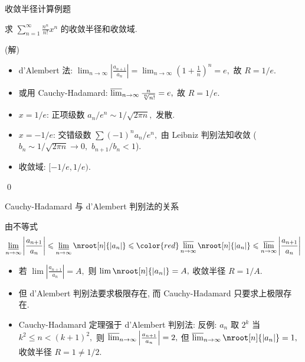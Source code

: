 \begin{frame}{收敛半径计算例题}

\begin{eg}
求 $\sum_{n=1}^\infty \frac{n^n}{n!} x^n$ 的收敛半径和收敛域.
\end{eg}

\pause

\startproof[bg=yellow, fg=red](解)
\begin{itemize}[<+->]
\item d'Alembert 法: $\lim_{n\to\infty} \left\lvert \frac{a_{n+1}}{a_n} \right\rvert = \lim_{n\to\infty} \left(1 + \frac{1}{n}\right)^n = e,$ 故 $R = 1/e.$
\item 或用 Cauchy-Hadamard: $\varlimsup_{n\to\infty} \frac{n}{\sqrt[n]{n!}} = e,$ 故 $R = 1/e.$
\item $x = 1/e$: 正项级数 $a_n/e^n \sim 1/\sqrt{2\pi n},$ 发散.
\item $x = -1/e$: 交错级数 $\sum (-1)^n a_n/e^n,$ 由 Leibniz 判别法知收敛 ($b_n \sim 1/\sqrt{2\pi n} \to 0,$ $b_{n+1}/b_n < 1$).
\item 收敛域: $[-1/e, 1/e).$
\end{itemize}
\qed

\end{frame}


\begin{frame}{Cauchy-Hadamard 与 d'Alembert 判别法的关系}

由不等式
\[\varliminf_{n\to\infty} \left\lvert \frac{a_{n+1}}{a_n} \right\rvert \leqslant \varliminf_{n\to\infty} \nroot[n]{|a_n|} \leqslant {\color{red}\varlimsup_{n\to\infty} \nroot[n]{|a_n|}} \leqslant \varlimsup_{n\to\infty} \left\lvert \frac{a_{n+1}}{a_n} \right\rvert\]

\pause

\begin{itemize}[<+->]
\item 若 $\lim \left\lvert \frac{a_{n+1}}{a_n} \right\rvert = A,$ 则 $\lim \nroot[n]{|a_n|} = A,$ 收敛半径 $R = 1/A.$
\item 但 d'Alembert 判别法要求极限存在, 而 Cauchy-Hadamard 只要求上极限存在.
\item Cauchy-Hadamard 定理{\color{red}强于} d'Alembert 判别法: 反例: $a_n$ 取 $2^k$ 当 $k^2 \leqslant n < (k+1)^2,$ 则 $\varlimsup_{n\to\infty} \left\lvert \frac{a_{n+1}}{a_n} \right\rvert = 2,$ 但 $\varlimsup_{n\to\infty} \nroot[n]{|a_n|} = 1,$ 收敛半径 $R = 1 \neq 1/2.$
\end{itemize}

\end{frame}

